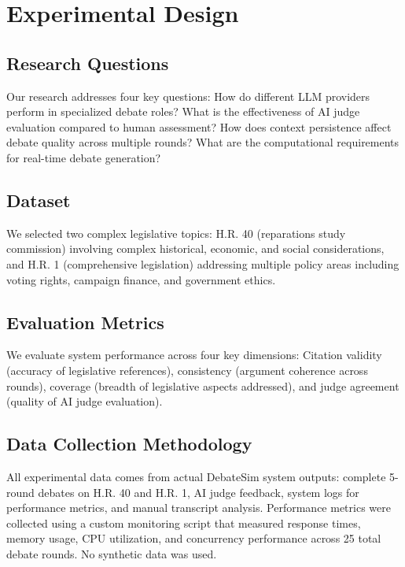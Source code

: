 \documentclass{article}
\begin{document}
\section{Experimental Design}

\subsection{Research Questions}

Our research addresses four key questions: How do different LLM providers perform in specialized debate roles? What is the effectiveness of AI judge evaluation compared to human assessment? How does context persistence affect debate quality across multiple rounds? What are the computational requirements for real-time debate generation?

\subsection{Dataset}

We selected two complex legislative topics: H.R. 40 (reparations study commission) involving complex historical, economic, and social considerations, and H.R. 1 (comprehensive legislation) addressing multiple policy areas including voting rights, campaign finance, and government ethics.

\subsection{Evaluation Metrics}

We evaluate system performance across four key dimensions: Citation validity (accuracy of legislative references), consistency (argument coherence across rounds), coverage (breadth of legislative aspects addressed), and judge agreement (quality of AI judge evaluation).

\subsection{Data Collection Methodology}

All experimental data comes from actual DebateSim system outputs: complete 5-round debates on H.R. 40 and H.R. 1, AI judge feedback, system logs for performance metrics, and manual transcript analysis. Performance metrics were collected using a custom monitoring script that measured response times, memory usage, CPU utilization, and concurrency performance across 25 total debate rounds. No synthetic data was used.
\end{document}
